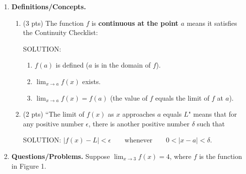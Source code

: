 \documentclass[11pt,letterpaper]{article}
\begin{document}
\begin{enumerate}
\item  \textbf{Definitions/Concepts.} 
\begin{enumerate}
\item (3 pts) The function $f$ is {\bf continuous at the point $a$} means it satisfies the Continuity Checklist:

\vspace{1pc}
SOLUTION:
\begin{enumerate}[1.]
\item $f(a)$ is defined ($a$ is in the domain of $f$).
\item $\lim_{x\to a}f(x)$ exists.
\item $\lim_{x\to a}f(x)=f(a)$ (the value of $f$ equals the limit of $f$ at $a$).
\end{enumerate}

\vspace{1pc}
\item (2 pts) ``The limit of $f(x)$ as $x$ approaches $a$ equals $L$" means that for any positive number $\epsilon$, there is another positive number $\delta$ such that

\vspace{1pc}
SOLUTION: \hspace{5ex}$|f(x)-L|<\epsilon\qquad\text{whenever}\qquad 0<|x-a|<\delta$.
\end{enumerate}

\vspace{1pc}
\item \textbf{Questions/Problems.} Suppose $\lim_{x\to 3}f(x)=4$, where $f$ is the function in Figure 1.


\end{enumerate}
\end{document}
